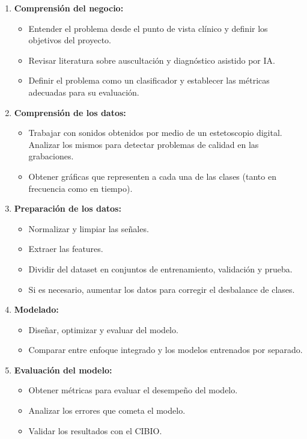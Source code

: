 \documentclass[
11pt, %
]{charter}
\begin{document}
\begin{enumerate}
  \item \textbf{Comprensión del negocio:}
    \begin{itemize}
      \item Entender el problema desde el punto de vista clínico y definir los objetivos del proyecto.
      \item Revisar literatura sobre auscultación y diagnóstico asistido por IA.
      \item Definir el problema como un clasificador y establecer las métricas adecuadas para su evaluación.
    \end{itemize}
  \item \textbf{Comprensión de los datos:}
    \begin{itemize}
      \item Trabajar con sonidos obtenidos por medio de un estetoscopio digital. Analizar los mismos
      para detectar problemas de calidad en las grabaciones.
      \item Obtener gráficas que representen a cada una de las clases (tanto en frecuencia como en tiempo).
    \end{itemize}
  \item \textbf{Preparación de los datos:}
    \begin{itemize}
      \item Normalizar y limpiar las señales.
      \item Extraer las features.
      \item Dividir del dataset en conjuntos de entrenamiento, validación y prueba.
      \item Si es necesario, aumentar los datos para corregir el desbalance de clases.
    \end{itemize}
  \item \textbf{Modelado:}
    \begin{itemize}
      \item Diseñar, optimizar y evaluar del modelo.
      \item Comparar entre enfoque integrado y los modelos entrenados por separado.
    \end{itemize}
  \item \textbf{Evaluación del modelo:}
    \begin{itemize}
      \item Obtener métricas para evaluar el desempeño del modelo.
      \item Analizar los errores que cometa el modelo.
      \item Validar los resultados con el CIBIO.
    \end{itemize}
\end{enumerate}
\end{document}
